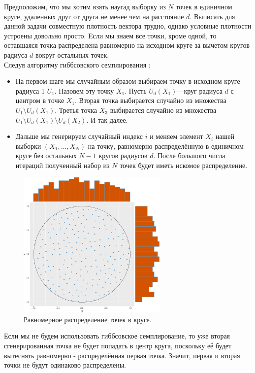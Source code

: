 \documentclass[14pt,a4paper]{article}
\begin{document}
Предположим, что мы хотим взять наугад выборку из $N$ точек в единичном круге, удаленных друг от друга не менее чем на расстояние $d$. Выписать для данной задачи совместную плотность вектора трудно, однако условные плотности устроены довольно просто. Eсли мы знаем все точки, кроме одной, то оставшаяся точка распределена равномерно на исходном круге за вычетом кругов радиуса $d$ вокруг остальных точек.
\[\]
Следуя алгоритму гиббсовского семплирования :
\begin{itemize}
    \item На первом шаге мы случайным образом выбираем точку в исходном круге радиуса 1 $U_1$. Назовем эту точку $X_1$. Пусть $U_d(X_1)$---круг радиуса $d$ с центром в точке $X_1$. Вторая точка выбирается случайно из множества $U_1 \setminus U_d(X_1)$. Третья точка $X_3$ выбирается случайно из множества $U_1 \setminus U_d(X_1)\setminus U_d(X_2)$. И так далее.
    \item Дальше мы генерируем случайный индекс $i$ и меняем элемент $X_i$ нашей выборки $(X_1, \dots, X_N)$ на точку, равномерно распределённую в единичном круге без остальных $N-1$ кругов радиусов $d$. После большого числа итераций полученный набор из $N$ точек будет иметь искомое распределение.
\end{itemize}

\begin{figure}[H]
    \centering
    \includegraphics[width=0.65\textwidth]{imgs/RplotGRU.pdf}
    \caption{Равномерное распределение точек в круге.}
    \label{fig:my_label}
\end{figure}

Если мы не будем использовать гиббсовское семплирование, то уже вторая сгенерированная точка не будет попадать в центр круга, поскольку её будет вытеснять равномерно - распределённая первая точка. Значит, первая и вторая точки не будут одинаково распределены.
\end{document}
